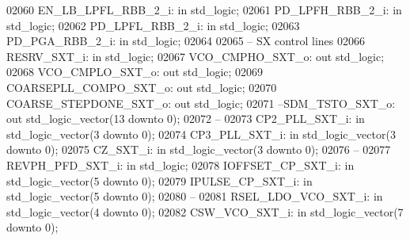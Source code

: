 \begin{DoxyCode}
02060     EN\_LB\_LPFL\_RBB\_2\_i: \textcolor{keywordflow}{in} \textcolor{comment}{std\_logic};
02061     PD\_LPFH\_RBB\_2\_i:    \textcolor{keywordflow}{in} \textcolor{comment}{std\_logic};
02062     PD\_LPFL\_RBB\_2\_i:    \textcolor{keywordflow}{in} \textcolor{comment}{std\_logic};
02063     PD\_PGA\_RBB\_2\_i: \textcolor{keywordflow}{in} \textcolor{comment}{std\_logic};
02064 
02065 \textcolor{keyword}{    -- SX control lines }
02066     RESRV\_SXT\_i:    \textcolor{keywordflow}{in} \textcolor{comment}{std\_logic};
02067     VCO\_CMPHO\_SXT\_o:    \textcolor{keywordflow}{out} \textcolor{comment}{std\_logic};
02068     VCO\_CMPLO\_SXT\_o:    \textcolor{keywordflow}{out} \textcolor{comment}{std\_logic};
02069     COARSEPLL\_COMPO\_SXT\_o:  \textcolor{keywordflow}{out} \textcolor{comment}{std\_logic};
02070     COARSE\_STEPDONE\_SXT\_o:  \textcolor{keywordflow}{out} \textcolor{comment}{std\_logic};
02071 \textcolor{keyword}{    --SDM\_TSTO\_SXT\_o:   out std\_logic\_vector(13 downto 0);}
02072 \textcolor{keyword}{    --}
02073     CP2\_PLL\_SXT\_i:  \textcolor{keywordflow}{in} \textcolor{comment}{std\_logic\_vector}(\textcolor{vhdllogic}{}\textcolor{vhdllogic}{3} \textcolor{keywordflow}{downto} \textcolor{vhdllogic}{}\textcolor{vhdllogic}{0});
02074     CP3\_PLL\_SXT\_i:  \textcolor{keywordflow}{in} \textcolor{comment}{std\_logic\_vector}(\textcolor{vhdllogic}{}\textcolor{vhdllogic}{3} \textcolor{keywordflow}{downto} \textcolor{vhdllogic}{}\textcolor{vhdllogic}{0});
02075     CZ\_SXT\_i:   \textcolor{keywordflow}{in} \textcolor{comment}{std\_logic\_vector}(\textcolor{vhdllogic}{}\textcolor{vhdllogic}{3} \textcolor{keywordflow}{downto} \textcolor{vhdllogic}{}\textcolor{vhdllogic}{0});
02076 \textcolor{keyword}{    --}
02077     REVPH\_PFD\_SXT\_i:    \textcolor{keywordflow}{in} \textcolor{comment}{std\_logic};
02078     IOFFSET\_CP\_SXT\_i:   \textcolor{keywordflow}{in} \textcolor{comment}{std\_logic\_vector}(\textcolor{vhdllogic}{}\textcolor{vhdllogic}{5} \textcolor{keywordflow}{downto} \textcolor{vhdllogic}{}\textcolor{vhdllogic}{0});
02079     IPULSE\_CP\_SXT\_i:    \textcolor{keywordflow}{in} \textcolor{comment}{std\_logic\_vector}(\textcolor{vhdllogic}{}\textcolor{vhdllogic}{5} \textcolor{keywordflow}{downto} \textcolor{vhdllogic}{}\textcolor{vhdllogic}{0});
02080 \textcolor{keyword}{    --}
02081     RSEL\_LDO\_VCO\_SXT\_i: \textcolor{keywordflow}{in} \textcolor{comment}{std\_logic\_vector}(\textcolor{vhdllogic}{}\textcolor{vhdllogic}{4} \textcolor{keywordflow}{downto} \textcolor{vhdllogic}{}\textcolor{vhdllogic}{0});
02082     CSW\_VCO\_SXT\_i:  \textcolor{keywordflow}{in} \textcolor{comment}{std\_logic\_vector}(\textcolor{vhdllogic}{}\textcolor{vhdllogic}{7} \textcolor{keywordflow}{downto} \textcolor{vhdllogic}{}\textcolor{vhdllogic}{0});

\end{DoxyCode}
